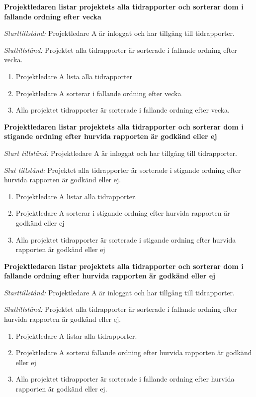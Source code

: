 \documentclass[a4paper]{article}
\begin{document}
\begin{FT}

\item %
\textbf{Projektledaren listar projektets alla tidrapporter och sorterar dom i fallande ordning efter vecka} 

\emph{Starttillstånd:} Projektledare A är inloggat och har tillgång till tidrapporter.

\emph{Sluttillstånd:} Projektet alla tidrapporter är sorterade i fallande ordning efter vecka.

\begin{enumerate}
\item Projektledare A lista alla tidrapporter
\item Projektledare A sorterar i fallande ordning efter vecka
\item Alla projektet tidrapporter är sorterade i fallande ordning efter vecka.
\end{enumerate}

\item %
\textbf{Projektledaren listar projektets alla tidrapporter och sorterar dom i stigande ordning efter hurvida rapporten är godkänd eller ej}

\emph{Start tillstånd:} Projektledare A är inloggat och har tillgång till tidrapporter.

\emph{Slut tillstånd:} Projektet alla tidrapporter är sorterade i stigande ordning efter hurvida rapporten är godkänd eller ej.

\begin{enumerate}
\item Projektledare A listar alla tidrapporter.
\item Projektledare A sorterar i stigande ordning efter hurvida rapporten är godkänd eller ej
\item Alla projektet tidrapporter är sorterade i stigande ordning efter hurvida rapporten är godkänd eller ej
\end{enumerate}

\item %
\textbf{Projektledaren listar projektets alla tidrapporter och sorterar dom i fallande ordning efter hurvida rapporten är godkänd eller ej}

\emph{Starttillstånd:} Projektledare A är inloggat och har tillgång till tidrapporter.

\emph{Sluttillstånd:} Projektet alla tidrapporter är sorterade i fallande ordning efter hurvida rapporten är godkänd eller ej.

\begin{enumerate}
\item Projektledare A listar alla tidrapporter.
\item Projektledare A sorterai fallande ordning efter hurvida rapporten är godkänd eller ej
\item Alla projektet tidrapporter är sorterade i fallande ordning efter hurvida rapporten är godkänd eller ej.
\end{enumerate}

\end{FT}
\end{document}
